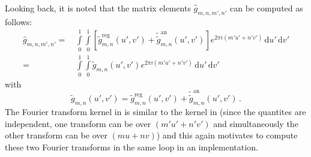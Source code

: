 %
Looking back, it is noted that the matrix elements $\hat{g}_{m,n,m',n'}$
can be computed as follows:
\begin{align}
 \hat{g}_{m,n,m',n'}
 =&\, \int\limits_0^1 \int\limits_0^1
        \left[
            \tilde{g}^\textrm{reg}_{m,n}(u',v')
          + \tilde{\tilde{g}}^\mathrm{an}_{m,n}(u',v')
        \right] e^{2 \pi i (m' u' + n' v')}
        \,\mathrm{d}u' \,\mathrm{d}v' \nonumber \\
 =&\, \int\limits_0^1 \int\limits_0^1
        \tilde{g}_{m,n}(u',v') e^{2 \pi i (m' u' + n' v')}
        \,\mathrm{d}u' \,\mathrm{d}v' \label{eqn:ft_g_total}
\end{align}
with
\begin{equation}
 \tilde{g}_{m,n}(u',v') = \tilde{g}^\textrm{reg}_{m,n}(u',v')
          + \tilde{\tilde{g}}^\mathrm{an}_{m,n}(u',v') \, .
\end{equation}
%
The Fourier transform kernel in 
is similar to the kernel in 
(since the quantites are independent, one transform can be over $(m' u' + n' v')$
and simultaneously the other transform can be over $(m u + n v)$)
and this again motivates to compute these two Fourier transforms
in the same loop in an implementation.

